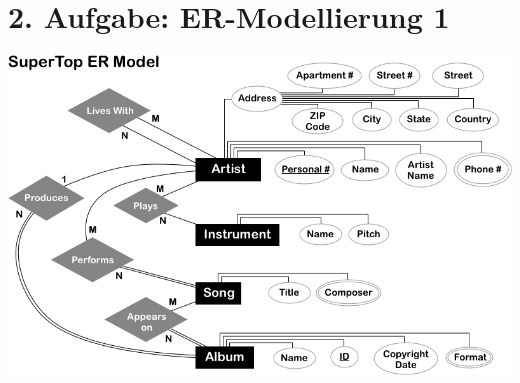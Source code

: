\documentclass[12pt]{report}
\begin{document}
\section*{2. Aufgabe: ER-Modellierung 1}
\includegraphics[scale = 0.7, angle = -90]{Q2}

%

\newpage
\end{document}
